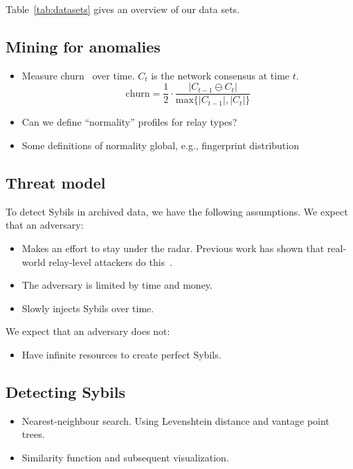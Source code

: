 Table~\ref{tab:datasets} gives an overview of our data sets.

\subsection{Mining for anomalies}
\begin{itemize}
	\item Measure churn~\cite{Godfrey2006a} over time.  $C_{t}$ is the network
		consensus at time $t$.
$$
\textrm{churn} = \frac{1}{2} \cdot \frac{\lvert C_{t-1} \ominus C_{t} \rvert}
{\textrm{max}\{\lvert C_{t-1} \rvert, \lvert C_{t} \rvert \}}
$$

	\item Can we define ``normality'' profiles for relay types?

	\item Some definitions of normality global, e.g., fingerprint distribution
\end{itemize}

\subsection{Threat model}
To detect Sybils in archived data, we have the following assumptions.  We
expect that an adversary:
\begin{itemize}
	\item Makes an effort to stay under the radar.  Previous work has shown
		that real-world relay-level attackers do this~\cite{Winter2014a}.

	\item The adversary is limited by time and money.

	\item Slowly injects Sybils over time.
\end{itemize}

We expect that an adversary does not:
\begin{itemize}
	\item Have infinite resources to create perfect Sybils.
\end{itemize}

\subsection{Detecting Sybils}
\begin{itemize}
	\item Nearest-neighbour search.  Using Levenshtein distance and vantage
		point trees.

	\item Similarity function and subsequent visualization.
\end{itemize}


